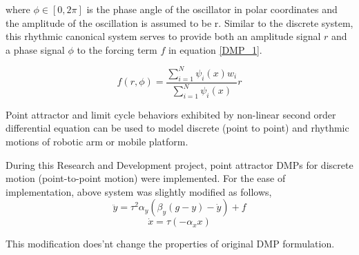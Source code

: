 where $\phi \in [0, 2\pi]$ is the phase angle of the oscillator in polar coordinates and the amplitude of the oscillation is assumed to be r. Similar to the discrete system, this rhythmic canonical system serves to provide both an amplitude signal $r$ and a phase signal $\phi$ to the forcing term $f$ in equation \ref{DMP_1}.

\begin{equation}
	f(r, \phi) = \frac{\sum_{i=1}^{N}\psi_{i}(x)w_{i}}{\sum_{i=1}^{N}\psi_{i}(x)}r
\end{equation}

\par Point attractor and limit cycle behaviors exhibited by non-linear second order differential equation can be used to model discrete (point to point) and rhythmic motions of robotic arm or mobile platform.   
\vspace{0.5cm}

During this Research and Development project, point attractor DMPs for discrete motion (point-to-point motion) were implemented. For the ease of implementation, above system was slightly modified as follows, 
\begin{equation}\label{actual_DMP}
	\ddot{y} = \tau^{2}\alpha_{y}(\beta_{y}(g-y)-\dot{y}) + f
\end{equation}
\begin{equation}
	\dot{x} = \tau(-\alpha_{x}x)
\end{equation}

This modification does'nt change the properties of original DMP formulation.


